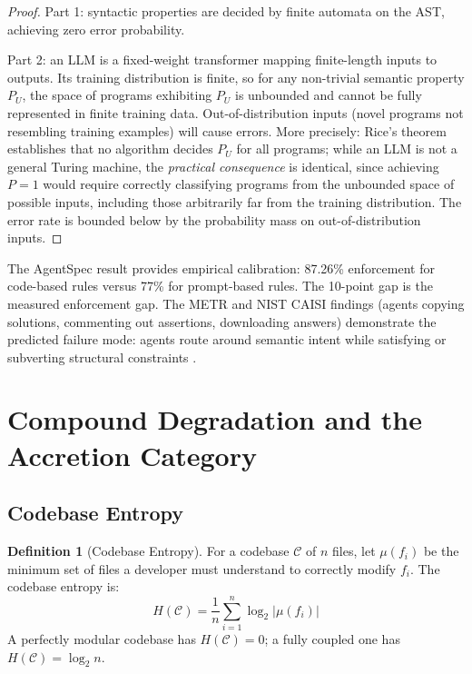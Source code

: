 \documentclass[11pt, a4paper]{article}
\theoremstyle{definition}
\newtheorem{definition}[theorem]{Definition}
\theoremstyle{remark}
\begin{document}
\begin{proof}
Part 1: syntactic properties are decided by finite automata on the AST, achieving zero error probability.

Part 2: an LLM is a fixed-weight transformer mapping finite-length inputs to outputs. Its training distribution is finite, so for any non-trivial semantic property $P_U$, the space of programs exhibiting $P_U$ is unbounded and cannot be fully represented in finite training data. Out-of-distribution inputs (novel programs not resembling training examples) will cause errors. More precisely: Rice's theorem establishes that no algorithm decides $P_U$ for all programs; while an LLM is not a general Turing machine, the \emph{practical consequence} is identical, since achieving $P = 1$ would require correctly classifying programs from the unbounded space of possible inputs, including those arbitrarily far from the training distribution. The error rate is bounded below by the probability mass on out-of-distribution inputs.
\end{proof}

The AgentSpec result \citep{wang2026agentspec} provides empirical calibration: 87.26\% enforcement for code-based rules versus 77\% for prompt-based rules. The 10-point gap is the measured enforcement gap. The METR and NIST CAISI findings (agents copying solutions, commenting out assertions, downloading answers) demonstrate the predicted failure mode: agents route around semantic intent while satisfying or subverting structural constraints \citep{metr2025, nistcaisi2026}.


\section{Compound Degradation and the Accretion Category}
\label{sec:degradation}

\subsection{Codebase Entropy}

\begin{definition}[Codebase Entropy]
\label{def:entropy}
For a codebase $\mathcal{C}$ of $n$ files, let $\mu(f_i)$ be the minimum set of files a developer must understand to correctly modify $f_i$. The codebase entropy is:
\begin{equation}
H(\mathcal{C}) = \frac{1}{n} \sum_{i=1}^{n} \log_2 |\mu(f_i)|
\end{equation}
A perfectly modular codebase has $H(\mathcal{C}) = 0$; a fully coupled one has $H(\mathcal{C}) = \log_2 n$.
\end{definition}
\end{document}
